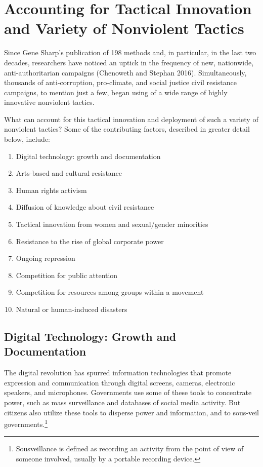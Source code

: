 \documentclass[twoside,a4paper,12pt,fleqn,openany]{extbook}
\begin{document}
\chapter{Accounting for Tactical Innovation and Variety of Nonviolent Tactics}

Since Gene Sharp’s publication of 198 methods and, in particular, in the last two decades, researchers have noticed an uptick in the frequency of new, nationwide, anti-authoritarian campaigns (Chenoweth and Stephan 2016). Simultaneously, thousands of anti-corruption, pro-climate, and social justice civil resistance campaigns, to mention just a few, began using of a wide range of highly innovative nonviolent tactics.

What can account for this tactical innovation and deployment of such a variety of nonviolent tactics? Some of the contributing factors, described in greater detail below, include:

\begin{enumerate}
\item Digital technology: growth and documentation
\item Arts-based and cultural resistance
\item Human rights activism
\item Diffusion of knowledge about civil resistance
\item Tactical innovation from women and sexual/gender minorities
\item Resistance to the rise of global corporate power
\item Ongoing repression
\item Competition for public attention
\item Competition for resources among groups within a movement
\item Natural or human-induced disasters
\end{enumerate}

\section*{Digital Technology: Growth and Documentation}

The digital revolution has spurred information technologies that promote expression and communication through digital screens, cameras, electronic speakers, and microphones. Governments use some of these tools to concentrate power, such as mass surveillance and databases of social media activity. But citizens also utilize these tools to disperse power and information, and to sous-veil governments.\footnote{Sousveillance is defined as recording an activity from the point of view of someone involved, usually by a portable recording device.}
\end{document}
